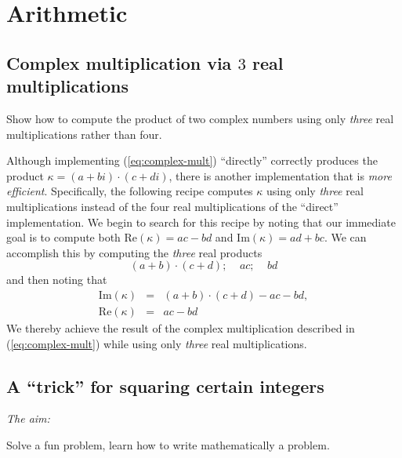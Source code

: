 
\section{Arithmetic}

\subsection{Complex
  multiplication via $3$ real multiplications}

Show how to compute the product of two complex numbers using only {\em three}
real multiplications rather than four.
\medskip

Although implementing (\ref{eq:complex-mult}) ``directly'' correctly
produces the product $\kappa = (a+bi) \cdot (c+di)$, there is another
implementation that is {\em more efficient}.  Specifically, the
following recipe computes $\kappa$ using only {\em three} real
multiplications instead of the four real multiplications of the
``direct'' implementation.  We begin to search for this recipe by
noting that our immediate goal is to compute both Re$(\kappa) = ac-bd$
and Im$(\kappa) = ad+bc$.  We can accomplish this by computing the
{\em three} real products
\begin{equation}
\label{eq:complex-mult-3a}
(a+b) \cdot (c+d); \ \ \ \ \
ac;  \ \ \ \ \ bd
\end{equation}
and then noting that
\begin{equation}
\label{eq:complex-mult-3b}
\begin{array}{lcl}
\mbox{Im}(\kappa) & = & (a+b) \cdot (c+d) - ac -bd, \\
\mbox{Re}(\kappa) & = & ac -bd
\end{array}
\end{equation}
We thereby achieve the result of the complex multiplication described
in (\ref{eq:complex-mult}) while using only {\em three} real
multiplications.


\subsection{A ``trick'' for squaring certain integers}

\noindent \textit{The aim:}

Solve a fun problem, learn how to write mathematically a problem.

